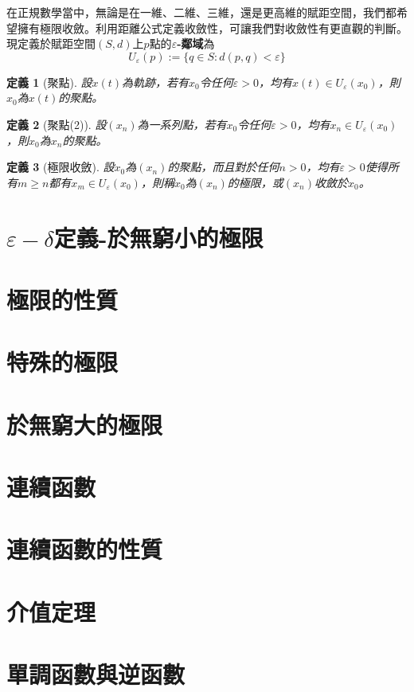 \documentclass[12pt]{article}
\newtheorem{definition}{定義}
\begin{document}
    在正規數學當中，無論是在一維、二維、三維，還是更高維的賦距空間，我們都希望擁有極限收斂。利用距離公式定義收斂性，可讓我們對收斂性有更直觀的判斷。現定義於賦距空間$(S,d)$上$p$點的\textbf{$\varepsilon$-鄰域}為$$U_\varepsilon(p):=\{q\in S:d(p,q)<\varepsilon\}$$

    \begin{definition}[聚點]
        設$x(t)$為軌跡，若有$x_0$令任何$\varepsilon>0$，均有$x(t)\in U_\varepsilon(x_0)$，則$x_0$為$x(t)$的聚點。
    \end{definition}

    \begin{definition}[聚點(2)]
        設$(x_n)$為一系列點，若有$x_0$令任何$\varepsilon>0$，均有$x_n\in U_\varepsilon(x_0)$，則$x_0$為$x_n$的聚點。
    \end{definition}

    \begin{definition}[極限收斂]
        設$x_0$為$(x_n)$的聚點，而且對於任何$n>0$，均有$\varepsilon>0$使得所有$m\geq n$都有$x_m\in U_\varepsilon(x_0)$，則稱$x_0$為$(x_n)$的極限，或$(x_n)$收斂於$x_0$。
    \end{definition}

    \section*{$\varepsilon-\delta$定義-於無窮小的極限}
    \section*{極限的性質}
    \section*{特殊的極限}
    \section*{於無窮大的極限}
    \section*{連續函數}
    \section*{連續函數的性質}
    \section*{介值定理}
    \section*{單調函數與逆函數}
\end{document}
